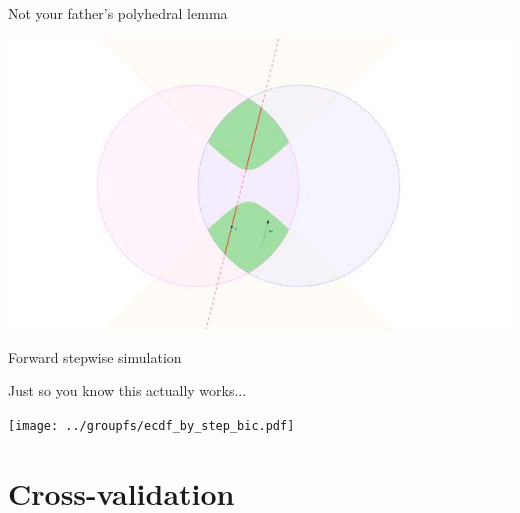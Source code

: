 \documentclass{beamer}
\newcommand{\tr}{\text{tr}}
\newcommand{\te}{\text{te}}
\begin{document}
\begin{frame}{Not your father's polyhedral lemma}

  \includegraphics[width=\textwidth]{leonard.jpeg}

\end{frame}

\begin{frame}{Forward stepwise simulation}

Just so you know this actually works...

\texttt{[image: ../groupfs/ecdf\_by\_step\_bic.pdf]}
  
\end{frame}

\section{Cross-validation}






\end{document}
